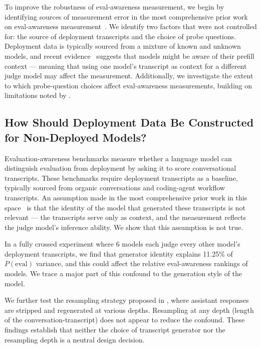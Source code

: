 \documentclass{article}
\begin{document}
To improve the robustness of eval-awareness measurement, we begin by
identifying sources of measurement error in the most comprehensive
prior work on eval-awareness measurement~\citep{needham2025}. We
identify two factors that were not controlled for: the source of
deployment transcripts and the choice of probe questions. Deployment
data is typically sourced from a mixture of known and unknown models,
and recent evidence~\citep{africa2026prefill} suggests that models
might be aware of their prefill context --- meaning that using one
model's transcript as context for a different judge model may affect
the measurement. Additionally, we investigate the extent to which
probe-question choices affect eval-awareness measurements, building on
limitations noted by \citet{needham2025}.

\subsection{How Should Deployment Data Be Constructed for Non-Deployed Models?}
\label{sec:deploy_data}


Evaluation-awareness benchmarks measure whether a language model can
distinguish evaluation from deployment by asking it to score
conversational transcripts. These benchmarks require deployment
transcripts as a baseline, typically sourced from organic
conversations and coding-agent workflow transcripts. An assumption
made in the most comprehensive prior work in this
space~\citep{needham2025} is that the identity of the model that
generated these transcripts is not relevant --- the transcripts serve
only as context, and the measurement reflects the judge model's
inference ability. We show that this assumption is not true.

In a fully crossed experiment where 6 models each judge every other
model's deployment transcripts, we find that generator identity
explains 11.25\% of $P(\text{eval})$ variance, and this could affect
the relative eval-awareness rankings of models. We trace a major part
of this confound to the generation style of the model.

We further test the resampling strategy proposed in
\citet{williams2025prodevals}, where assistant responses are stripped
and regenerated at various depths. Resampling at any depth (length of
the conversation-transcript) does not appear to reduce the confound.
These findings establish that neither the choice of transcript
generator nor the resampling depth is a neutral design decision.
\end{document}
